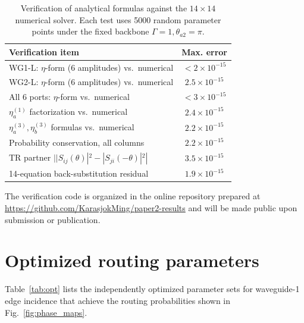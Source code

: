 \documentclass[aps,pra,reprint,superscriptaddress,nofootinbib,longbibliography,floatfix]{revtex4-2}
\begin{document}
\begin{table}[!htbp]
\caption{Verification of analytical formulas against the $14\times14$ numerical solver. Each test uses 5000 random parameter points under the fixed backbone $\Gamma=1,\theta_{a2}=\pi$.}
\label{tab:verification}
\centering
\begin{ruledtabular}
\begin{tabular}{lc}
Verification item & Max. error \\
\hline
WG1-L: $\eta$-form (6 amplitudes) vs.~numerical & $<2\times10^{-15}$ \\
WG2-L: $\eta$-form (6 amplitudes) vs.~numerical & $2.5\times10^{-15}$ \\
All 6 ports: $\eta$-form vs.~numerical & $<3\times10^{-15}$ \\
$\eta_a^{(1)}$ factorization vs.~numerical & $2.4\times10^{-15}$ \\
$\eta_a^{(3)},\eta_b^{(3)}$ formulas vs.~numerical & $2.2\times10^{-15}$ \\
Probability conservation, all columns & $2.2\times10^{-15}$ \\
TR partner $||S_{ij}(\theta)|^2-|S_{ji}(-\theta)|^2|$ & $3.5\times10^{-15}$ \\
14-equation back-substitution residual & $1.9\times10^{-15}$ \\
\end{tabular}
\end{ruledtabular}
\end{table}

The verification code is organized in the online repository prepared at \url{https://github.com/KarasjokMing/paper2-results} and will be made public upon submission or publication.

\section{Optimized routing parameters}
\label{app:opt}

Table~\ref{tab:opt} lists the independently optimized parameter sets for waveguide-1 edge incidence that achieve the routing probabilities shown in Fig.~\ref{fig:phase_maps}.
\end{document}

